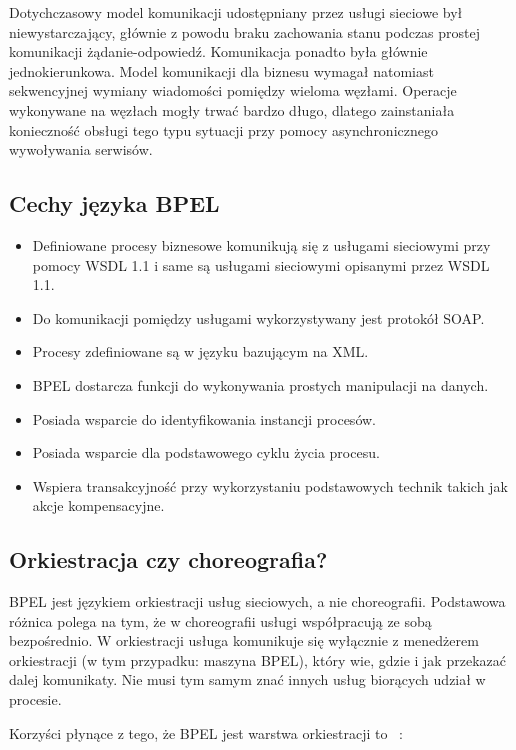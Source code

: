 Dotychczasowy model komunikacji udostępniany przez usługi sieciowe był niewystarczający, głównie z powodu braku zachowania stanu podczas prostej komunikacji żądanie-odpowiedź.  Komunikacja ponadto była głównie jednokierunkowa. Model komunikacji dla biznesu wymagał natomiast sekwencyjnej wymiany wiadomości pomiędzy wieloma węzłami. Operacje wykonywane na węzłach mogły trwać bardzo długo, dlatego zainstaniała konieczność obsługi tego typu sytuacji przy pomocy asynchronicznego wywoływania serwisów. ~\cite{OASISBPELSpec}

\subsection{Cechy języka BPEL}
\label{sec:bpelFeatures}

\begin{itemize}
\item Definiowane procesy biznesowe komunikują się z usługami sieciowymi przy pomocy WSDL 1.1 i same są usługami sieciowymi opisanymi przez WSDL 1.1.  
\item Do komunikacji pomiędzy usługami wykorzystywany jest protokół SOAP.
\item Procesy zdefiniowane są w języku bazującym na XML.
\item BPEL dostarcza funkcji do wykonywania prostych manipulacji na danych.
\item Posiada wsparcie do identyfikowania instancji procesów.
\item Posiada wsparcie dla podstawowego cyklu życia procesu.
\item Wspiera transakcyjność przy wykorzystaniu podstawowych technik takich jak akcje kompensacyjne.
\end{itemize}

\subsection{Orkiestracja czy choreografia?}
\label{sec:bpelOrchestration}
BPEL jest językiem orkiestracji usług sieciowych, a nie choreografii. Podstawowa różnica polega na tym, że w choreografii usługi współpracują ze sobą bezpośrednio. W orkiestracji usługa komunikuje się wyłącznie z menedżerem orkiestracji (w tym przypadku: maszyna BPEL), który wie, gdzie i jak przekazać dalej komunikaty. Nie musi tym samym znać innych usług biorących udział w procesie. 

Korzyści płynące z tego, że BPEL jest warstwa orkiestracji to ~\cite{wiao}:

